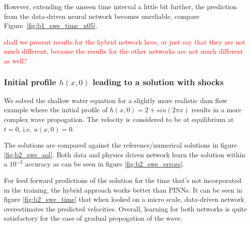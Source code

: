 However, extending the unseen time interval a little bit further, the prediction from the 
data-driven neural network becomes unreliable, compare Figure~\ref{fig:b1_swe_time_x05}.

\textcolor{red}{shall we present results for the hybrid network here, or just say that they are not 
much different, because the results for the other networks are not much different as well?}

\subsubsection{Initial profile $h(x,0)$ leading to a solution with shocks}

We solved the shallow water equation for a slightly more realistic dam flow example where the initial profile of $h(x,0) =2+sin (2\pi x) $ results in a more complex wave propogation. The velocity is considered to be at equilibrium at $t=0$, i.e. $u(x, 0) = 0$. 
\par
\noindent
The solutions are compared against the reference/numerical solutions in figure \ref{fig:b2_swe_sol}. Both data and physics driven network learn the solution within a $10^{-2}$ accuracy as can be seen in figure \ref{fig:b2_swe_errors}.
\par
\noindent
For feed forward predictions of the solution for the time that's not incorporated in the training, the hybrid approach works better than PINNs. It can be seen in figure \ref{fig:b2_swe_time} that when looked on a micro scale, data-driven network overestimates the predicted velocities. Overall, learning for both networks is quite satisfactory for the case of gradual propogation of the wave. 

